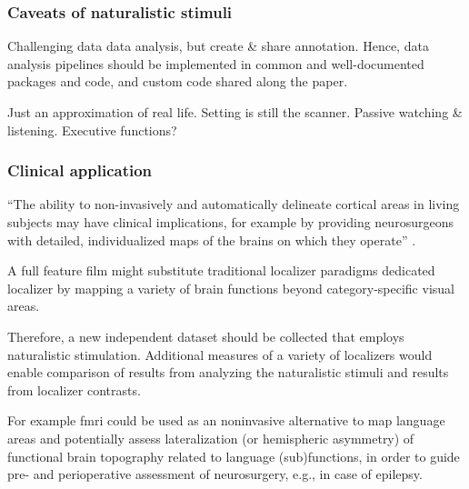 \subsubsection{Caveats of naturalistic stimuli}
%
Challenging data data analysis, but create \& share annotation.
%
Hence, data analysis pipelines should be implemented in common and
well-documented packages and code, and custom code shared along the paper.

%
Just an approximation of real life.
%
Setting is still the scanner.
%
Passive watching \& listening.
%
Executive functions?


\subsubsection{Clinical application}


%
``The ability to non-invasively and automatically delineate cortical areas in
living subjects may have clinical implications, for example by providing
neurosurgeons with detailed, individualized maps of the brains on which they
operate'' \citep{glasser2016multi}.

%
A full feature film might substitute traditional localizer paradigms dedicated
localizer by mapping a variety of brain functions beyond category-specific
visual areas.

%
Therefore, a new independent dataset should be collected that employs
naturalistic stimulation.
%
Additional measures of a variety of localizers would enable comparison of
results from analyzing the naturalistic stimuli and results from localizer
contrasts.

%
For example \ac{fmri} could be used as an noninvasive alternative to map
language areas and potentially assess lateralization (or hemispheric asymmetry)
of functional brain topography related to language (sub)functions, in order to
guide pre- and perioperative assessment of neurosurgery, e.g., in case of
epilepsy.




